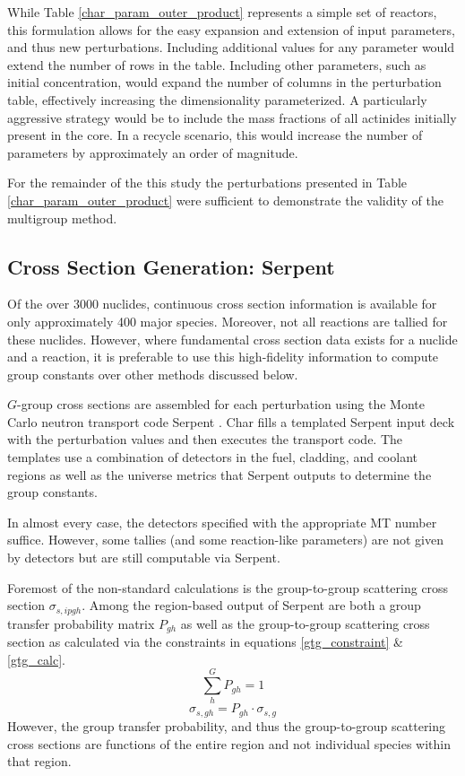 While Table \ref{char_param_outer_product} represents a simple set of reactors, this formulation 
allows for the easy expansion and extension of input parameters, and thus new perturbations. 
Including additional values for any parameter would extend the number of rows in the table.  
Including other parameters, such as initial  concentration, would expand the number of
columns in the perturbation table, effectively increasing the dimensionality parameterized.
A particularly aggressive strategy would be to include the mass fractions of all actinides initially
present in the core.  In a recycle scenario, this would increase the number of parameters by 
approximately an order of magnitude.  

For the remainder of the this study the perturbations presented in Table \ref{char_param_outer_product}
were sufficient to demonstrate the validity of the multigroup method.

\subsection{Cross Section Generation: Serpent}
\label{mg:xs_gen_serpent}
Of the over 3000 nuclides, continuous cross section information is available for only 
approximately 400 major species.  Moreover, not all reactions are tallied 
for these nuclides.  However, where fundamental cross section data exists for a nuclide
and a reaction, it is preferable to use this high-fidelity information to compute group
constants over other methods discussed below.

$G$-group cross sections are assembled for each perturbation using the Monte Carlo neutron
transport code Serpent \cite{Lepp2011}.  Char fills a templated Serpent input deck with the
perturbation values and then executes the transport code.  The templates use a combination 
of detectors in the fuel, cladding, and coolant regions as well as the universe metrics that 
Serpent outputs to determine the group constants.

In almost every case, the detectors specified with the appropriate MT number suffice.  
However, some tallies (and some reaction-like parameters) are not given by detectors
but are still computable via Serpent.

Foremost of the non-standard calculations is the group-to-group scattering cross section
$\sigma_{s,ipgh}$.  Among the region-based output of Serpent are both a group transfer
probability matrix $P_{gh}$ as well as the group-to-group scattering cross section
as calculated via the constraints in equations \ref{gtg_constraint} \& \ref{gtg_calc}.
\begin{equation}
\label{gtg_constraint}
\sum_h^G P_{gh} = 1
\end{equation}
\begin{equation}
\label{gtg_calc}
\sigma_{s,gh} = P_{gh} \cdot \sigma_{s,g}
\end{equation}
However, the group transfer probability, and thus the group-to-group scattering cross sections
are functions of the entire region and not individual species within that region.  

